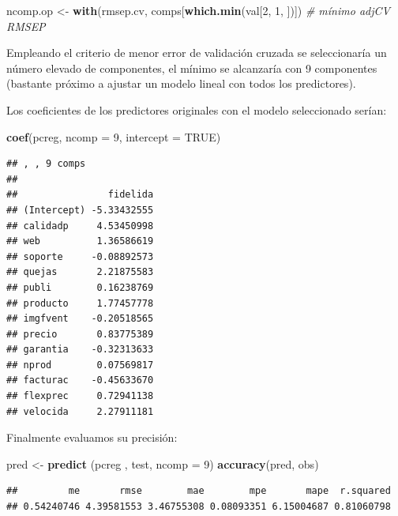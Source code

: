 \documentclass[
]{book}
\newenvironment{Shaded}{\begin{snugshade}}{\end{snugshade}}
\newcommand{\CommentTok}[1]{\textcolor[rgb]{0.56,0.35,0.01}{\textit{#1}}}
\newcommand{\DataTypeTok}[1]{\textcolor[rgb]{0.13,0.29,0.53}{#1}}
\newcommand{\DecValTok}[1]{\textcolor[rgb]{0.00,0.00,0.81}{#1}}
\newcommand{\KeywordTok}[1]{\textcolor[rgb]{0.13,0.29,0.53}{\textbf{#1}}}
\newcommand{\NormalTok}[1]{#1}
\newcommand{\OtherTok}[1]{\textcolor[rgb]{0.56,0.35,0.01}{#1}}
\newcommand{\StringTok}[1]{\textcolor[rgb]{0.31,0.60,0.02}{#1}}
\theoremstyle{break}
\theoremstyle{definition}
\theoremstyle{definition}
\theoremstyle{definition}
\theoremstyle{remark}
\begin{document}
\begin{Shaded}
\begin{Highlighting}[]
\NormalTok{ncomp.op <-}\StringTok{ }\KeywordTok{with}\NormalTok{(rmsep.cv, comps[}\KeywordTok{which.min}\NormalTok{(val[}\DecValTok{2}\NormalTok{, }\DecValTok{1}\NormalTok{, ])]) }\CommentTok{# mínimo adjCV RMSEP}
\end{Highlighting}
\end{Shaded}

Empleando el criterio de menor error de validación cruzada se seleccionaría un número elevado de componentes, el mínimo se alcanzaría con 9 componentes (bastante próximo a ajustar un modelo lineal con todos los predictores).

Los coeficientes de los predictores originales con el modelo seleccionado serían:

\begin{Shaded}
\begin{Highlighting}[]
\KeywordTok{coef}\NormalTok{(pcreg, }\DataTypeTok{ncomp =} \DecValTok{9}\NormalTok{, }\DataTypeTok{intercept =} \OtherTok{TRUE}\NormalTok{)}
\end{Highlighting}
\end{Shaded}

\begin{verbatim}
## , , 9 comps
## 
##                fidelida
## (Intercept) -5.33432555
## calidadp     4.53450998
## web          1.36586619
## soporte     -0.08892573
## quejas       2.21875583
## publi        0.16238769
## producto     1.77457778
## imgfvent    -0.20518565
## precio       0.83775389
## garantia    -0.32313633
## nprod        0.07569817
## facturac    -0.45633670
## flexprec     0.72941138
## velocida     2.27911181
\end{verbatim}

Finalmente evaluamos su precisión:

\begin{Shaded}
\begin{Highlighting}[]
\NormalTok{pred <-}\StringTok{ }\KeywordTok{predict}\NormalTok{ (pcreg , test, }\DataTypeTok{ncomp =} \DecValTok{9}\NormalTok{)}
\KeywordTok{accuracy}\NormalTok{(pred, obs)}
\end{Highlighting}
\end{Shaded}

\begin{verbatim}
##         me       rmse        mae        mpe       mape  r.squared 
## 0.54240746 4.39581553 3.46755308 0.08093351 6.15004687 0.81060798
\end{verbatim}
\end{document}
